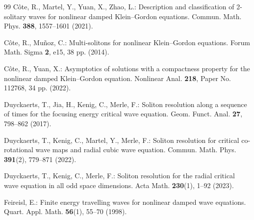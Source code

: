 \documentclass[reqno]{amsart}
\theoremstyle{plain}
\theoremstyle{definition}
\numberwithin{equation}{section}
\begin{document}
\begin{thebibliography}{99}
 C\^ote, R., Martel, Y., Yuan, X., Zhao, L.:
Description and classification of 2-solitary waves for nonlinear damped Klein--Gordon equations.
Commun. Math. Phys. \textbf{388}, 1557--1601 (2021).

 C\^ote, R., Mu\~noz, C.:
Multi-solitons for nonlinear Klein--Gordon equations.
Forum Math. Sigma \textbf{2}, e15, 38 pp. (2014).


 C\^ote, R., Yuan, X.:
Asymptotics of solutions with a compactness property for the nonlinear damped Klein--Gordon equation.
Nonlinear Anal. \textbf{218}, Paper No. 112768, 34 pp. (2022).

 Duyckaerts, T., Jia, H., Kenig, C., Merle, F.:
Soliton resolution along a sequence of times for the focusing energy critical wave equation.
Geom. Funct. Anal. \textbf{27}, 798--862 (2017).

 Duyckaerts, T., Kenig, C., Martel, Y., Merle, F.:
Soliton resolution for critical co-rotational wave maps and radial cubic wave equation.
Commun. Math. Phys. \textbf{391}(2), 779--871 (2022).


%

 Duyckaerts, T., Kenig, C., Merle, F.:
Soliton resolution for the radial critical wave equation in all odd space dimensions.
Acta Math. \textbf{230}(1), 1--92 (2023).

 Feireisl, E.:
Finite energy travelling waves for nonlinear damped wave equations.
Quart. Appl. Math. \textbf{56}(1), 55--70 (1998).

%


\end{thebibliography}
\end{document}
